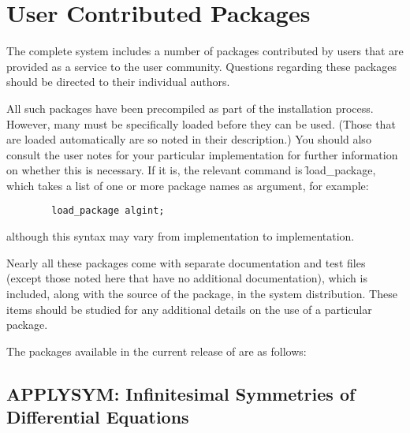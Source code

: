 %
%



\chapter{User Contributed Packages} 
\label{chap-user}
The complete {\REDUCE} system includes a number of packages contributed by
users that are provided as a service to the user community.  Questions
regarding these packages should be directed to their individual authors.

All such packages have been precompiled as part of the installation process.
However, many must be specifically loaded before they can be used. (Those
that are loaded automatically are so noted in their description.) You should
also consult the user notes for your particular implementation for further
information on whether this is necessary.  If it is, the relevant command is
\f{load\_package}, which takes a list of one or
more package names as argument, for example:

\begin{verbatim}
        load_package algint;
\end{verbatim}
although this syntax may vary from implementation to implementation.

Nearly all these packages come with separate documentation and test files
(except those noted here that have no additional documentation), which is
included, along with the source of the package, in the {\REDUCE} system
distribution.  These items should be studied for any additional details on
the use of a particular package.

\let\origsectionmark=\sectionmark
\def\sectionmark#1{}


The packages available in the current release of {\REDUCE} are as follows:

\newpage

\section{APPLYSYM: Infinitesimal Symmetries of Differential Equations}
\label{package:APPLYSYM}

